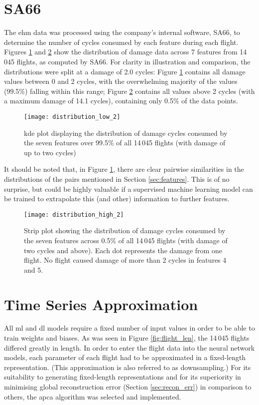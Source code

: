 \section{SA66} \label{sec:cyclecounter}
The \ac{ehm} data was processed using the company's internal software, SA66, to determine the number of cycles consumed by each feature during each flight. Figures \ref{fig:dmg_dist_low} and \ref{fig:dmg_dist_high} show the distribution of damage data across 7 features from 14\,045 flights, as computed by SA66. For clarity in illustration and comparison, the distributions were split at a damage of 2.0 cycles: Figure \ref{fig:dmg_dist_low} contains all damage values between 0 and 2 cycles, with the overwhelming majority of the values (99.5\%) falling within this range; Figure \ref{fig:dmg_dist_high} contains all values above 2 cycles (with a maximum damage of 14.1 cycles), containing only 0.5\% of the data points.

\begin{figure}[tb!]
    \centering
    \texttt{[image: distribution\_low\_2]}
    \caption{\label{fig:dmg_dist_low} \ac{kde} plot displaying the distribution of damage cycles consumed by the seven features over 99.5\% of all 14\,045 flights (with damage of up to two cycles)}
\end{figure}

It should be noted that, in Figure \ref{fig:dmg_dist_low}, there are clear pairwise similarities in the distributions of the pairs mentioned in Section \ref{sec:features}. This is of no surprise, but could be highly valuable if a supervised machine learning model can be trained to extrapolate this (and other) information to further features.

\begin{figure}[tb!]
    \centering
    \texttt{[image: distribution\_high\_2]}
    \caption{\label{fig:dmg_dist_high} Strip plot showing the distribution of damage cycles consumed by the seven features across 0.5\% of all 14\,045 flights (with damage of two cycles and above). Each dot represents the damage from one flight. No flight caused damage of more than 2 cycles in features 4 and 5.}
\end{figure}

\section{Time Series Approximation} \label{sec:downsample}
All \ac{ml} and \ac{dl} models require a fixed number of input values in order to be able to train weights and biases. As was seen in Figure \ref{fig:flight_len}, the 14\,045 flights differed greatly in length. In order to enter the flight data into the neural network models, each parameter of each flight had to be approximated in a fixed-length representation. (This approximation is also referred to as downsampling.) For its suitability to generating fixed-length representations and for its superiority in minimising global reconstruction error (Section \ref{sec:recon_err}) in comparison to others, the \ac{apca} algorithm \cite[]{keogh_locally_2002} was selected and implemented.

